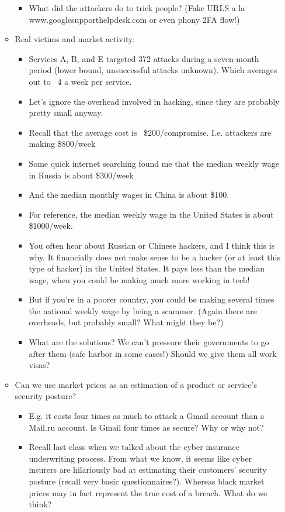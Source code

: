 \documentclass[11pt]{article}
\begin{document}
\begin{itemize}
\begin{itemize}
\begin{itemize}
            \item What did the attackers do to trick people? (Fake URLS a la www.googlesupporthelpdesk.com or even phony 2FA flow!)
        \end{itemize}
        \item Real victims and market activity:
        \begin{itemize}
            \item Services A, B, and E targeted 372 attacks during a seven-month period (lower bound, unsuccessful attacks unknown). Which averages out to ~4 a week per service. 
            \item Let's ignore the overhead involved in hacking, since they are probably pretty small anyway.
            \item Recall that the average cost is ~\$200/compromise. I.e. attackers are making \$800/week
            \item Some quick internet searching found me that the median weekly wage in Russia is about \$300/week
            \item And the median monthly wages in China is about \$100.
            \item For reference, the median weekly wage in the United States is about \$1000/week. 
            \item You often hear about Russian or Chinese hackers, and I think this is why. It financially does not make sense to be a hacker (or at least this type of hacker) in the United States. It pays less than the median wage, when you could be making much more working in tech! 
            \item But if you're in a poorer country, you could be making several times the national weekly wage by being a scammer. (Again there are overheads, but probably small? What might they be?)
            \item What are the solutions? We can't pressure their governments to go after them (safe harbor in some cases!) Should we give them all work visas?
        \end{itemize}
        \item Can we use market prices as an estimation of a product or service's security posture?
        \begin{itemize}
            \item E.g. it costs four times as much to attack a Gmail account than a Mail.ru account. Is Gmail four times as secure? Why or why not?
            \item Recall last class when we talked about the cyber insurance underwriting process. From what we know, it seems like cyber insurers are hilariously bad at estimating their customers' security posture (recall very basic questionnaires?). Whereas black market prices may in fact represent the true cost of a breach. What do we think?

\end{itemize}
\end{itemize}
\end{itemize}
\end{document}

